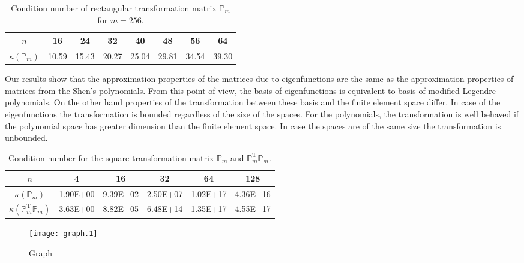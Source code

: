 \documentclass[a4paper,10pt]{article}
\newcommand{\Pmat}{\ensuremath{\mathbb{P}_m}}                  %
\newcommand{\Pmatt}{\ensuremath{\mathbb{P}_m^{\text{T}}}}       %
\begin{document}
  \begin{table}
    \begin{center}
    \begin{tabular}{|c||c|c|c|c|c|c|c|}
      \hline
      $n$           & 16 & 24 & 32 & 40 & 48 & 56 & 64\\
      \hline\hline
      $\kappa\left(\Pmat\right)$ & 10.59 & 15.43 & 20.27 & 25.04 & 29.81 & 34.54 & 39.30 \\
      \hline
    \end{tabular}
  \caption{Condition number of rectangular transformation matrix $\Pmat$ for
  $m=256$.}
  \label{tab:shen_Pm}
  \end{center}
  \end{table}
  Our results show that the approximation properties of the matrices due to
  eigenfunctions are the same as the approximation properties of matrices from
  the Shen's polynomials. From this point of view, the basis of eigenfunctions
  is equivalent to basis of modified Legendre polynomials. On the other hand
  properties of the transformation between these basis and the finite element
  space differ. In case of the eigenfunctions the transformation is bounded
  regardless of the size of the spaces. For the polynomials, the transformation
  is well behaved if the polynomial space has greater dimension than the finite
  element space. In case the spaces are of the same size the transformation is
  unbounded.
  \begin{table}
    \begin{center}
    \begin{tabular}{|c||c|c|c|c|c|}
      \hline
      $n$           &4& 16& 32& 64& 128 \\
      \hline\hline
      $\kappa(\Pmat)$ & 1.90E+00& 9.39E+02& 2.50E+07& 1.02E+17& 4.36E+16\\
      \hline
      $\kappa(\Pmatt\Pmat)$ & 3.63E+00& 8.82E+05& 6.48E+14& 1.35E+17& 4.55E+17\\
      \hline
    \end{tabular}
  \caption{Condition number for the square transformation matrix $\Pmat$ and
  $\Pmatt\Pmat$.}
  \label{tab:shen_P}
  \end{center}
  \end{table}


 
  \begin{figure}
    \begin{center}
      \texttt{[image: graph.1]}
    \caption{Graph}
    \label{fig:graph}
    \end{center}
  \end{figure}
\end{document}
